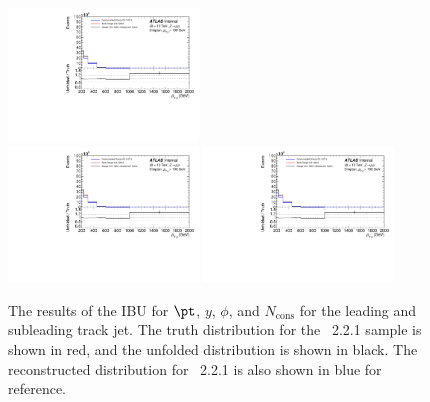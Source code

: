 \begin{figure}[h!]
  \includegraphics[page=94,width=0.45\textwidth]{figures/IBUPlots.pdf} \\
  \includegraphics[page=99,width=0.45\textwidth]{figures/IBUPlots.pdf}
  \includegraphics[page=100,width=0.45\textwidth]{figures/IBUPlots.pdf}
  \caption{The results of the IBU for $\pt$, $y$, $\phi$, and $N_{\text{cons}}$ for the leading and subleading track jet. The truth distribution for the \sherpa~2.2.1 sample is shown in red, and the unfolded distribution is shown in black. The reconstructed distribution for \sherpa~2.2.1 is also shown in blue for reference.}
  \label{fig:UnfoldIBUTJ1}
\end{figure}

